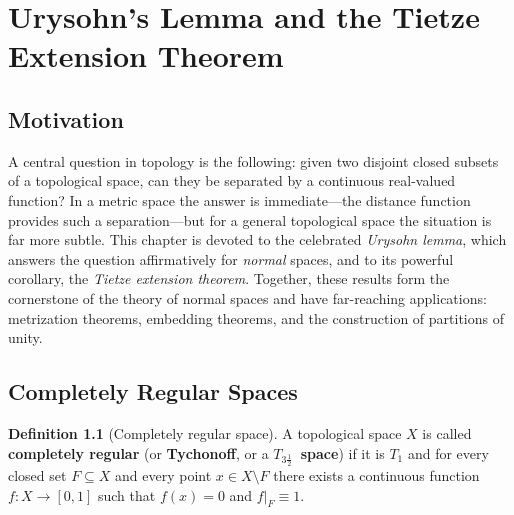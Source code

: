 \documentclass[11pt,a4paper,twoside]{book}
\theoremstyle{remark}
\theoremstyle{definition}
\theoremstyle{definition}
\newtheorem{definition}{Definition}[section]
\begin{document}

\chapter{Urysohn's Lemma and the Tietze Extension Theorem}
\label{ch:urysohn-tietze}

\section*{Motivation}

A central question in topology is the following: given two disjoint closed
subsets of a topological space, can they be separated by a continuous
real-valued function?  In a metric space the answer is immediate---the
distance function provides such a separation---but for a general
topological space the situation is far more subtle.  This chapter is
devoted to the celebrated \emph{Urysohn lemma}, which answers the question
affirmatively for \emph{normal} spaces, and to its powerful corollary, the
\emph{Tietze extension theorem}.  Together, these results form the
cornerstone of the theory of normal spaces and have far-reaching
applications: metrization theorems, embedding theorems, and the
construction of partitions of unity.

\section{Completely Regular Spaces}
\label{sec:completely-regular}

\begin{definition}[Completely regular space]
\label{def:completely-regular}
A topological space $X$ is called \textbf{completely regular}
(or \textbf{Tychonoff}, or a \textbf{$T_{3\frac{1}{2}}$~space}) if it
is $T_1$ and for every closed set $F\subseteq X$ and every point
$x\in X\setminus F$ there exists a continuous function
$f\colon X\to[0,1]$ such that $f(x)=0$ and $f|_F\equiv 1$.
\end{definition}
\end{document}
